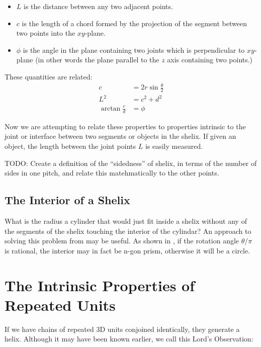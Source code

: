 \documentclass[11pt]{article}
\begin{document}
{\begin{itemize}
\item $L$ is the distance between any two adjacent points.
\item $c$ is the length of a chord formed by the projection of the segment between two points into the $xy$-plane.
\item $\phi$ is the angle in the plane containing two joints which is perpendicular to $xy$-plane
  (in other words the plane parallel to the $z$ axis containing two points.)
  \end{itemize}
These quantities are related:
\begin{align}
    c &= 2r\sin{\frac{\theta}{2}} \\
    L^2 &= c^2+d^2  \\
    \arctan{\frac{c}{d}}  &= \phi 
\end{align}

Now we are attempting to relate these properties to properties intrinsic to the joint or interface between
two segments or objects in the shelix. If given an object, the length between the joint points $L$ is
easily measured.

TODO: Create a definition of the ``sidedness'' of shelix,
in terms of the number of sides in one pitch, and relate
this matehmatically to the other points.

\subsection{The Interior of a Shelix}

What is the radius a cylinder that would just fit inside a shelix without any of the segments of the shelix
touching the interior of the cylindar? An approach to solving this problem from \cite{read2018transforming}
may be useful. As shown in \cite{read2018transforming}, if the rotation angle $\theta/\pi$ is rational, the
interior may in fact be n-gon prism, otherwise it will be a circle.

\section{The Intrinsic Properties of Repeated Units}

If we have chains of repeated 3D units conjoined identically, they generate a helix.
Although it may have been known earlier, we call this Lord's Observation:

}
\end{document}
